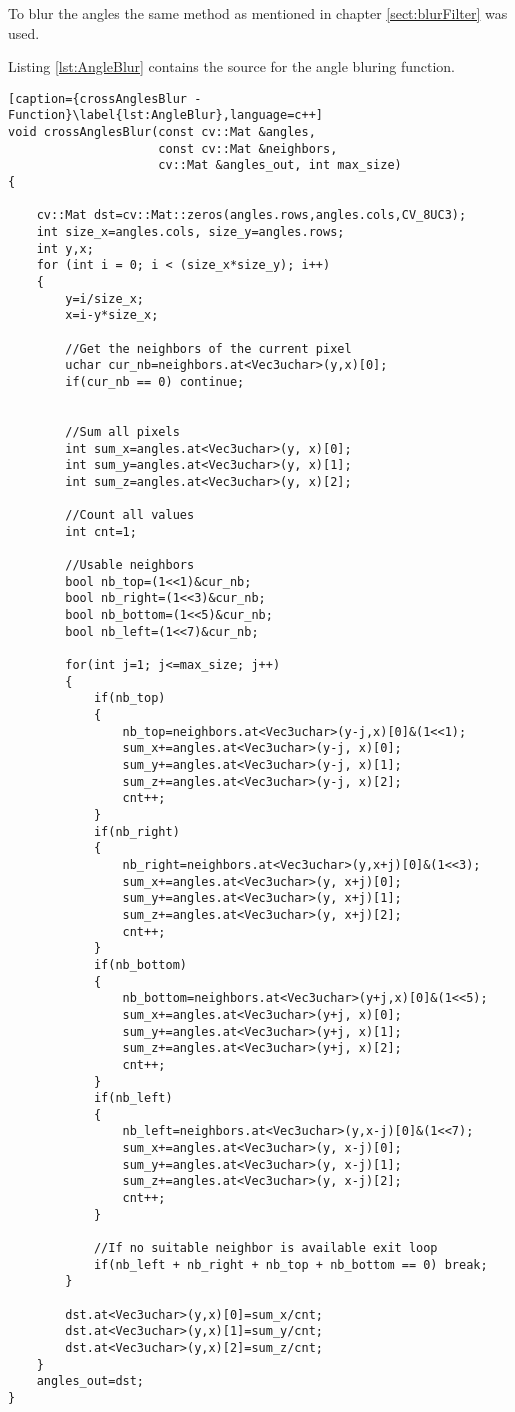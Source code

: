 To blur the angles the same method as mentioned in chapter \vref{sect:blurFilter} was used.

Listing \vref{lst:AngleBlur} contains the source for the angle bluring function.

\begin{lstlisting}[caption={crossAnglesBlur - Function}\label{lst:AngleBlur},language=c++]
void crossAnglesBlur(const cv::Mat &angles, 
                     const cv::Mat &neighbors, 
                     cv::Mat &angles_out, int max_size)
{

	cv::Mat dst=cv::Mat::zeros(angles.rows,angles.cols,CV_8UC3);
	int size_x=angles.cols, size_y=angles.rows;
	int y,x;
	for (int i = 0; i < (size_x*size_y); i++)
	{
		y=i/size_x;
		x=i-y*size_x;

		//Get the neighbors of the current pixel
		uchar cur_nb=neighbors.at<Vec3uchar>(y,x)[0];
		if(cur_nb == 0) continue;


		//Sum all pixels
		int sum_x=angles.at<Vec3uchar>(y, x)[0];
		int sum_y=angles.at<Vec3uchar>(y, x)[1];
		int sum_z=angles.at<Vec3uchar>(y, x)[2];

		//Count all values
		int cnt=1;

		//Usable neighbors
		bool nb_top=(1<<1)&cur_nb;
		bool nb_right=(1<<3)&cur_nb;
		bool nb_bottom=(1<<5)&cur_nb;
		bool nb_left=(1<<7)&cur_nb;

		for(int j=1; j<=max_size; j++)
		{
			if(nb_top)
			{
				nb_top=neighbors.at<Vec3uchar>(y-j,x)[0]&(1<<1);
				sum_x+=angles.at<Vec3uchar>(y-j, x)[0];
				sum_y+=angles.at<Vec3uchar>(y-j, x)[1];
				sum_z+=angles.at<Vec3uchar>(y-j, x)[2];
				cnt++;
			}
			if(nb_right)
			{
				nb_right=neighbors.at<Vec3uchar>(y,x+j)[0]&(1<<3);
				sum_x+=angles.at<Vec3uchar>(y, x+j)[0];
				sum_y+=angles.at<Vec3uchar>(y, x+j)[1];
				sum_z+=angles.at<Vec3uchar>(y, x+j)[2];
				cnt++;
			}
			if(nb_bottom)
			{
				nb_bottom=neighbors.at<Vec3uchar>(y+j,x)[0]&(1<<5);
				sum_x+=angles.at<Vec3uchar>(y+j, x)[0];
				sum_y+=angles.at<Vec3uchar>(y+j, x)[1];
				sum_z+=angles.at<Vec3uchar>(y+j, x)[2];
				cnt++;
			}
			if(nb_left)
			{
				nb_left=neighbors.at<Vec3uchar>(y,x-j)[0]&(1<<7);
				sum_x+=angles.at<Vec3uchar>(y, x-j)[0];
				sum_y+=angles.at<Vec3uchar>(y, x-j)[1];
				sum_z+=angles.at<Vec3uchar>(y, x-j)[2];
				cnt++;
			}

			//If no suitable neighbor is available exit loop
			if(nb_left + nb_right + nb_top + nb_bottom == 0) break;
		}

		dst.at<Vec3uchar>(y,x)[0]=sum_x/cnt;
		dst.at<Vec3uchar>(y,x)[1]=sum_y/cnt;
		dst.at<Vec3uchar>(y,x)[2]=sum_z/cnt;
	}
	angles_out=dst;
}
\end{lstlisting}

